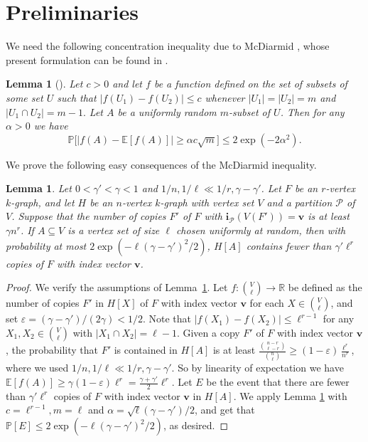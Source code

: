 \documentclass[11pt, letterpaper]{amsart}
\theoremstyle{plain}
\numberwithin{equation}{section}
\newtheorem{lemma}[thm]{Lemma}
\theoremstyle{definition}
\renewcommand{\vec}[1]{{\mathbf #1}}
\begin{document}
	\section{Preliminaries}\label{Preliminaries}

     We need the following concentration inequality due to McDiarmid \cite{mcdiarmid1989method}, whose present formulation can be found in \cite{liebenau2023asymptotic}.
 
	\begin{lemma}[\cite{liebenau2023asymptotic}]\label{hypergeometric}
	    Let $c>0$ and let $f$ be a function defined on the set of subsets of some set $U$ such that $|f(U_1)-f(U_2)|\le c$ whenever $|U_1|=|U_2|=m$ and $|U_1\cap U_2|=m-1.$ Let $A$ be a uniformly random $m$-subset of $U$. Then for any $\alpha>0$ we have \[\mathbb{P}\big[|f(A)-\mathbb{E}[f(A)]|\ge \alpha c\sqrt{m}\big]\le 2\exp{(-2\alpha^2)}.\]
	\end{lemma}

    We prove the following easy consequences of the McDiarmid inequality.


        \begin{lemma}\label{all robust edges}
               Let $0< \gamma'<\gamma<1$ and $1/n,1/\ell\ll 1/r,\gamma-\gamma'$. Let $F$ be an $r$-vertex $k$-graph, and let $H$ be an $n$-vertex $k$-graph with vertex set $V$ and a partition $\mathcal{P}$ of $V$. Suppose that the number of copies $F'$ of $F$ with $\vec{i}_{\mathcal{P}}(V(F'))=\vec{v}$ is at least $\gamma n^r $. If $A\subseteq V$ is a vertex set of size $\ell$ chosen uniformly at random, then with probability at most $2\exp{(-\ell(\gamma-\gamma')^2/2)}$, $H[A]$ contains fewer than $\gamma' \ell^r $ copies of $F$ with index vector $\vec{v}$.
        \end{lemma}
        \begin{proof}
             We verify the assumptions of Lemma~\ref{hypergeometric}. 
             Let $f:\binom{V}{\ell}\rightarrow\mathbb{R}$ be defined as the number of copies $F'$ in \(H[X]\) of $F$ with index vector \(\vec{v}\) for each $X\in \binom{V}{\ell}$, and set $\varepsilon=(\gamma-\gamma')/(2\gamma)<1/2$. 
             Note that $|f(X_1)-f(X_2)|\le {\ell}^{r-1}$ for any $X_1,X_2\in \binom{V}{\ell}$ with $|X_1\cap X_2|=\ell-1$. 
             Given a copy $F'$ of $F$ with index vector $\vec{v}$, the probability that $F'$ is contained in $H[A]$ is at least $\frac{\binom{n-r}{\ell-r}}{\binom{n}{\ell}}\ge (1-\varepsilon)\frac{{\ell}^{r}}{n^{r}}$, where we used $1/n,1/\ell\ll 1/r,\gamma-\gamma'$. 
             So by linearity of expectation we have $\mathbb{E}[f(A)]\ge \gamma(1-\varepsilon){\ell}^r=\frac{\gamma+\gamma'}{2}{\ell}^{r}$. 
             Let $E$ be the event that there are fewer than $\gamma' \ell^r$ copies of $F$ with index vector $\vec{v}$ in \(H[A]\). We apply Lemma \ref{hypergeometric} with $c={\ell}^{r-1}, m=\ell$ and $\alpha=\sqrt{\ell}(\gamma-\gamma')/2$, and get that $\mathbb{P}\left[E\right]\le 2\exp{\left(-\ell(\gamma-\gamma')^2/2\right)}$, as desired.
        \end{proof}
\end{document}
